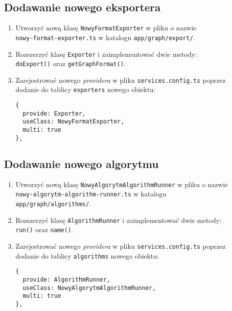 \subsection*{Dodawanie nowego eksportera}

\begin{enumerate}
\setlength\itemsep{0em}
\item Utworzyć nową klasę \texttt{NowyFormatExporter} w pliku o nazwie \\ \texttt{nowy-format-exporter.ts} w katalogu \texttt{app/graph/export/}.

\item Rozszerzyć klasę \texttt{Exporter} i zaimplementować dwie metody: \\ \texttt{doExport()} oraz \texttt{getGraphFormat()}.

\item Zarejestrować nowego \textit{providera} w pliku \texttt{services.config.ts} poprzez dodanie do tablicy \texttt{exporters} nowego obiektu:
\begin{verbatim}
{
  provide: Exporter, 
  useClass: NowyFormatExporter, 
  multi: true
},
\end{verbatim}
\end{enumerate}

\subsection*{Dodawanie nowego algorytmu}

\begin{enumerate}
\setlength\itemsep{0em}
\item Utworzyć nową klasę \texttt{NowyAlgorytmAlgorithmRunner} w pliku o nazwie \\ \texttt{nowy-algorytm-algorithm-runner.ts} w katalogu \\ \texttt{app/graph/algorithms/}.

\item Rozszerzyć klasę \texttt{AlgorithmRunner} i zaimplementować dwie metody: \\ \texttt{run()} oraz \texttt{name()}.

\item Zarejestrować nowego \textit{providera} w pliku \texttt{services.config.ts} poprzez dodanie do tablicy \texttt{algorithms} nowego obiektu:
\begin{verbatim}
{
  provide: AlgorithmRunner, 
  useClass: NowyAlgorytmAlgorithmRunner, 
  multi: true
},
\end{verbatim}
\end{enumerate}

